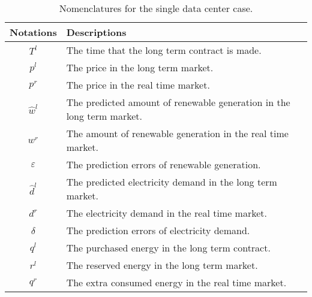 \begin{table}
\centering
\caption{Nomenclatures for the single data center case.}
\begin{tabular}{|c|p{6cm}|} \hline
Notations & Descriptions \\ \hline \hline
$T^{l}$ & The time that the long term contract is made. \\ \hline
$p^{l}$ & The price in the long term market. \\ \hline
$p^{r}$ & The price in the real time market. \\ \hline
$\hat{w}^{l}$ & The predicted amount of renewable generation in the long term market. \\ \hline
$w^{r}$ & The amount of renewable generation in the real time market. \\ \hline
$\varepsilon$ & The prediction errors of renewable generation. \\ \hline
$\hat{d}^{l}$ & The predicted electricity demand in the long term market. \\ \hline
$d^{r}$ & The electricity demand in the real time market. \\ \hline
$\delta$ & The prediction errors of electricity demand. \\ \hline
$q^{l}$ & The purchased energy in the long term contract. \\ \hline
$r^{l}$ & The reserved energy in the long term market. \\ \hline
$q^{r}$ & The extra consumed energy in the real time market. \\ \hline
\end{tabular}
\end{table}

